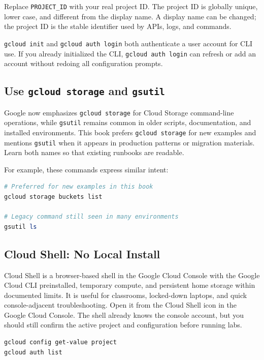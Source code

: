 Replace \texttt{PROJECT\_ID} with your real project ID. The project ID is globally unique, lower case, and different from the display name. A display name can be changed; the project ID is the stable identifier used by APIs, logs, and commands.

\begin{notebox}
\texttt{gcloud init} and \texttt{gcloud auth login} both authenticate a user account for CLI use. If you already initialized the CLI, \texttt{gcloud auth login} can refresh or add an account without redoing all configuration prompts.
\end{notebox}

\subsection{Use \texttt{gcloud storage} and \texttt{gsutil}}
Google now emphasizes \texttt{gcloud storage} for Cloud Storage command-line operations, while \texttt{gsutil} remains common in older scripts, documentation, and installed environments. This book prefers \texttt{gcloud storage} for new examples and mentions \texttt{gsutil} when it appears in production patterns or migration materials. Learn both names so that existing runbooks are readable.

For example, these commands express similar intent:

\begin{lstlisting}[language=PowerShell,caption={Modern and legacy Cloud Storage command examples.},label={lst:chapter0-storage-command-comparison}]
# Preferred for new examples in this book
gcloud storage buckets list

# Legacy command still seen in many environments
gsutil ls
\end{lstlisting}

\subsection{Cloud Shell: No Local Install}
Cloud Shell is a browser-based shell in the Google Cloud Console with the Google Cloud CLI preinstalled, temporary compute, and persistent home storage within documented limits. It is useful for classrooms, locked-down laptops, and quick console-adjacent troubleshooting. Open it from the Cloud Shell icon in the Google Cloud Console. The shell already knows the console account, but you should still confirm the active project and configuration before running labs.

\begin{lstlisting}[language=bash,caption={Checking the active project from Cloud Shell.},label={lst:chapter0-cloud-shell-check}]
gcloud config get-value project
gcloud auth list
\end{lstlisting}

